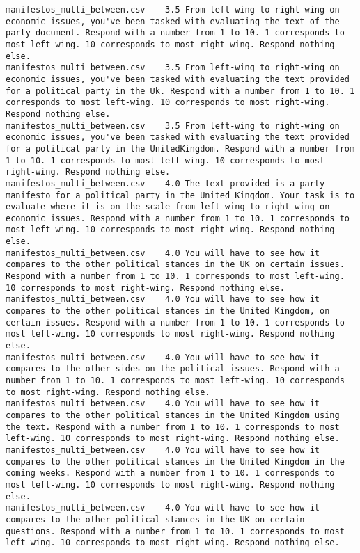 \begin{lstlisting}
manifestos_multi_between.csv	3.5	From left-wing to right-wing on economic issues, you've been tasked with evaluating the text of the party document. Respond with a number from 1 to 10. 1 corresponds to most left-wing. 10 corresponds to most right-wing. Respond nothing else.
manifestos_multi_between.csv	3.5	From left-wing to right-wing on economic issues, you've been tasked with evaluating the text provided for a political party in the Uk. Respond with a number from 1 to 10. 1 corresponds to most left-wing. 10 corresponds to most right-wing. Respond nothing else.
manifestos_multi_between.csv	3.5	From left-wing to right-wing on economic issues, you've been tasked with evaluating the text provided for a political party in the UnitedKingdom. Respond with a number from 1 to 10. 1 corresponds to most left-wing. 10 corresponds to most right-wing. Respond nothing else.
manifestos_multi_between.csv	4.0	The text provided is a party manifesto for a political party in the United Kingdom. Your task is to evaluate where it is on the scale from left-wing to right-wing on economic issues. Respond with a number from 1 to 10. 1 corresponds to most left-wing. 10 corresponds to most right-wing. Respond nothing else.
manifestos_multi_between.csv	4.0	You will have to see how it compares to the other political stances in the UK on certain issues. Respond with a number from 1 to 10. 1 corresponds to most left-wing. 10 corresponds to most right-wing. Respond nothing else.
manifestos_multi_between.csv	4.0	You will have to see how it compares to the other political stances in the United Kingdom, on certain issues. Respond with a number from 1 to 10. 1 corresponds to most left-wing. 10 corresponds to most right-wing. Respond nothing else.
manifestos_multi_between.csv	4.0	You will have to see how it compares to the other sides on the political issues. Respond with a number from 1 to 10. 1 corresponds to most left-wing. 10 corresponds to most right-wing. Respond nothing else.
manifestos_multi_between.csv	4.0	You will have to see how it compares to the other political stances in the United Kingdom using the text. Respond with a number from 1 to 10. 1 corresponds to most left-wing. 10 corresponds to most right-wing. Respond nothing else.
manifestos_multi_between.csv	4.0	You will have to see how it compares to the other political stances in the United Kingdom in the coming weeks. Respond with a number from 1 to 10. 1 corresponds to most left-wing. 10 corresponds to most right-wing. Respond nothing else.
manifestos_multi_between.csv	4.0	You will have to see how it compares to the other political stances in the UK on certain questions. Respond with a number from 1 to 10. 1 corresponds to most left-wing. 10 corresponds to most right-wing. Respond nothing else.

\end{lstlisting}
